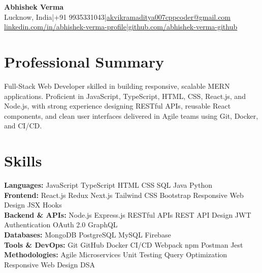 \documentclass[letterpaper,10pt]{article}
\newcommand{\headersep}{\hspace{5pt}\textcolor{rulegray}{|}\hspace{5pt}}
\begin{document}
\fontsize{9.3pt}{11.6pt}\selectfont

\begin{center}
  {\color{accent}\fontsize{20pt}{22pt}\selectfont\bfseries Abhishek Verma}\\[5pt]
  {\color{secondary}\small Lucknow, India\headersep +91 9935331043\headersep \href{mailto:akvikramaditya007cppcoder@gmail.com}{akvikramaditya007cppcoder@gmail.com}}\\[3pt]
  {\small\href{https://linkedin.com/in/abhishek-verma-profile}{linkedin.com/in/abhishek-verma-profile}\headersep \href{https://github.com/abhishek-verma-github}{github.com/abhishek-verma-github}}
\end{center}
\vspace{3pt}

\section{Professional Summary}
\noindent Full-Stack Web Developer skilled in building responsive, scalable MERN applications. Proficient in JavaScript, TypeScript, HTML, CSS, React.js, and Node.js, with strong experience designing RESTful APIs, reusable React components, and clean user interfaces delivered in Agile teams using Git, Docker, and CI/CD.

\section{Skills}
\noindent\textbf{Languages:} JavaScript \textperiodcentered{} TypeScript \textperiodcentered{} HTML \textperiodcentered{} CSS \textperiodcentered{} SQL \textperiodcentered{} Java \textperiodcentered{} Python\\
\noindent\textbf{Frontend:} React.js \textperiodcentered{} Redux \textperiodcentered{} Next.js \textperiodcentered{} Tailwind CSS \textperiodcentered{} Bootstrap \textperiodcentered{} Responsive Web Design \textperiodcentered{} JSX \textperiodcentered{} Hooks\\
\noindent\textbf{Backend \& APIs:} Node.js \textperiodcentered{} Express.js \textperiodcentered{} RESTful APIs \textperiodcentered{} REST API Design \textperiodcentered{} JWT Authentication \textperiodcentered{} OAuth 2.0 \textperiodcentered{} GraphQL\\
\noindent\textbf{Databases:} MongoDB \textperiodcentered{} PostgreSQL \textperiodcentered{} MySQL \textperiodcentered{} Firebase\\
\noindent\textbf{Tools \& DevOps:} Git \textperiodcentered{} GitHub \textperiodcentered{} Docker \textperiodcentered{} CI/CD \textperiodcentered{} Webpack \textperiodcentered{} npm \textperiodcentered{} Postman \textperiodcentered{} Jest\\
\noindent\textbf{Methodologies:} Agile \textperiodcentered{} Microservices \textperiodcentered{} Unit Testing \textperiodcentered{} Query Optimization \textperiodcentered{} Responsive Web Design \textperiodcentered{} DSA\\
\end{document}
